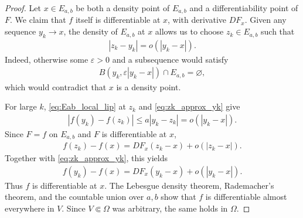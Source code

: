 \documentclass[11pt]{amsart}
\theoremstyle{plain}
\theoremstyle{plain}
\theoremstyle{plain}
\numberwithin{equation}{section}
\begin{document}
\begin{proof}
Let \(x\in E_{a,b}\) be both a density point of \(E_{a,b}\) and a
  differentiability point of \(F\).  We claim that \(f\) itself is
differentiable at \(x\), with derivative \(DF_x\).  Given any sequence
\(y_k\to x\), the density of \(E_{a,b}\) at \(x\) allows us to choose
\(z_k\in E_{a,b}\) such that
\begin{align}
|z_k-y_k|=o(|y_k-x|).
\label{eq:zk_approx_yk}
\end{align}
Indeed, otherwise some \(\varepsilon>0\) and a subsequence would
satisfy
\begin{align}
B(y_k,\varepsilon|y_k-x|)\cap E_{a,b}=\varnothing,\nonumber
\end{align}
which would contradict that \(x\) is a density point.  

For large \(k\),
\eqref{eq:Eab_local_lip} at \(z_k\) and
\eqref{eq:zk_approx_yk} give
\begin{align}
|f(y_k)-f(z_k)|
\leq
a|y_k-z_k|
=
o(|y_k-x|).\nonumber
\end{align}
Since \(F=f\) on \(E_{a,b}\) and \(F\) is differentiable at \(x\),
\begin{align}
f(z_k)-f(x)
=
DF_x(z_k-x)+o(|z_k-x|).\nonumber
\end{align}
Together with \eqref{eq:zk_approx_yk}, this yields
\begin{align}
f(y_k)-f(x)
=
DF_x(y_k-x)+o(|y_k-x|).\nonumber
\end{align}
Thus \(f\) is   differentiable at \(x\).  The Lebesgue density
theorem, Rademacher's theorem, and the countable union over \(a,b\) show
that \(f\) is   differentiable almost everywhere in \(V\).
Since \(V\Subset\Omega\) was arbitrary, the same holds in \(\Omega\).


\end{proof}
\end{document}

